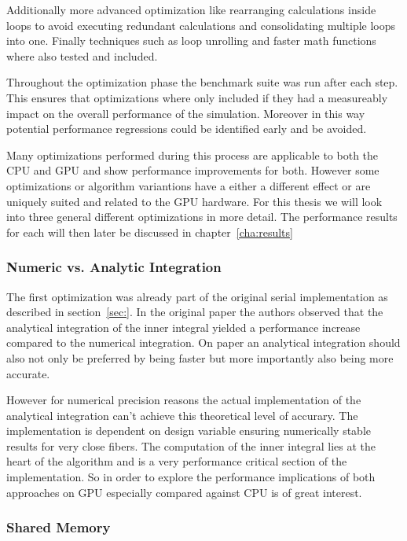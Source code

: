 \documentclass[a4paper,11pt]{kth-mag}
\begin{document}
Additionally more advanced optimization like rearranging calculations inside loops to avoid executing redundant calculations and consolidating multiple loops into one. Finally techniques such as loop unrolling and faster math functions where also tested and included.

Throughout the optimization phase the benchmark suite was run after each step. This ensures that optimizations where only included if they had a measureably impact on the overall performance of the simulation. Moreover in this way potential performance regressions could be identified early and be avoided.

Many optimizations performed during this process are applicable to both the CPU and GPU and show performance improvements for both. However some optimizations or algorithm variantions have a either a different effect or are uniquely suited and related to the GPU hardware. For this thesis we will look into three general different optimizations in more detail. The performance results for each will then later be discussed in chapter~\ref{cha:results}

\subsubsection{Numeric vs. Analytic Integration}
The first optimization was already part of the original serial implementation as described in section~\ref{sec:}. In the original paper \cite{} the authors observed that the analytical integration of the inner integral yielded a performance increase compared to the numerical integration. On paper an analytical integration should also not only be preferred by being faster but more importantly also being more accurate.

However for numerical precision reasons the actual implementation of the analytical integration can't achieve this theoretical level of accurary. The implementation is dependent on design variable ensuring numerically stable results for very close fibers. The computation of the inner integral lies at the heart of the algorithm and is a very performance critical section of the implementation. So in order to explore the performance implications of both approaches on GPU especially compared against CPU is of great interest.

\subsubsection{Shared Memory}
\end{document}
